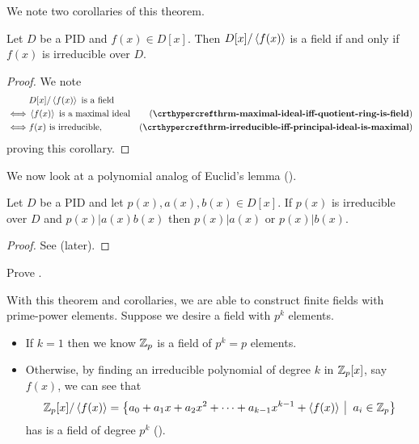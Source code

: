 We note two corollaries of this theorem.

\begin{corollary}\label{corollary-polynomial-quotient-by-principal-ideal-is-field-iff-polynomial-irreducible}
    Let $D$ be a PID and $f(x) \in D[x]$. Then $D[x]/\left\langle f(x)\right\rangle$ is a field if and only if $f(x)$ is irreducible over $D$.
\end{corollary}
\begin{proof}
    We note
    \begin{align*}
        &D[x]/\princ{f(x)} \text{ is a field}\\
        \iff&\princ{f(x)} \text{ is a maximal ideal} & (\myref{thrm-maximal-ideal-iff-quotient-ring-is-field})\\
        \iff&f(x) \text{ is irreducible,} & (\myref{thrm-irreducible-iff-principal-ideal-is-maximal})
    \end{align*}
    proving this corollary.
\end{proof}

We now look at a polynomial analog of Euclid's lemma ().

\begin{corollary}\label{corollary-irreducible-polynomial-division-rule}
    Let $D$ be a PID and let $p(x), a(x), b(x) \in D[x]$. If $p(x)$ is irreducible over $D$ and $p(x) \vert a(x)b(x)$ then $p(x) \vert a(x)$ or $p(x) \vert b(x)$.
\end{corollary}
\begin{proof}
    See  (later).
\end{proof}

\begin{exercise}\label{exercise-irreducible-polynomial-division-rule}
    Prove .
\end{exercise}

With this theorem and corollaries, we are able to construct finite fields with prime-power elements. Suppose we desire a field with $p^k$ elements. 
\begin{itemize}
    \item If $k = 1$ then we know $\mathbb{Z}_p$ is a field of $p^k = p$ elements.
    \item Otherwise, by finding an irreducible polynomial of degree $k$ in $\mathbb{Z}_p[x]$, say $f(x)$, we can see that
    \[
        \Z_p[x]/\princ{f(x)} = \left\{a_0 + a_1x + a_2x^2 + \cdots + a_{k-1}x^{k-1} + \princ{f(x)} \vert a_i \in \Z_p\right\}
    \]
    has is a field of degree $p^k$ ().
\end{itemize}

